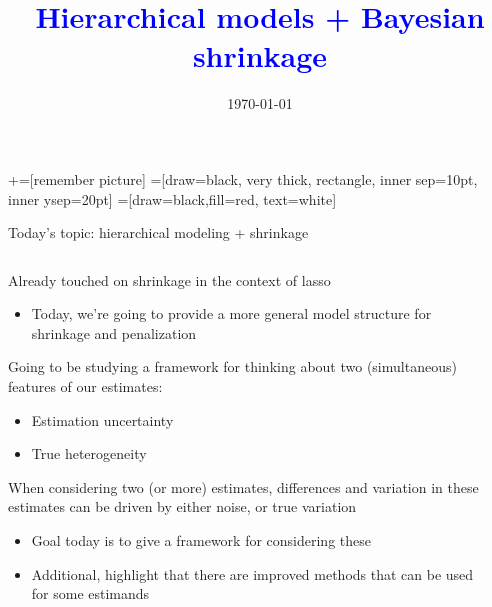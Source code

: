 \documentclass[notes,11pt, aspectratio=169]{beamer}
\title[]{\textcolor{blue}{Hierarchical models + Bayesian shrinkage}}
\author[PGP]{}
\institute[FRBNY]{\small{Paul Goldsmith-Pinkham}}
\date{\today}
\newenvironment{wideitemize}{\itemize\addtolength{\itemsep}{10pt}}{\enditemize}
\begin{document}
\newcommand\marktopleft[1]{%
    \tikz[overlay,remember picture] 
        \node (marker-#1-a) at (-.3em,.3em) {};%
}
\newcommand\markbottomright[2]{%
    \tikz[overlay,remember picture] 
        \node (marker-#1-b) at (0em,0em) {};%
}
+=[remember picture] 
 =[draw=black, very thick, rectangle, inner sep=10pt, inner ysep=20pt]
 =[draw=black,fill=red, text=white]

\begin{frame}
\maketitle

\end{frame}


\begin{frame}{Today's topic: hierarchical modeling + shrinkage}
  \begin{columns}[T] %
    \begin{column}{.7\textwidth}
      \begin{wideitemize}
      \item Already touched on shrinkage in the context of lasso
        \begin{itemize}
        \item Today, we're going to provide a more general model
          structure for shrinkage and penalization
        \end{itemize}
      \item Going to be studying a framework for thinking about two (simultaneous) features of our estimates:
        \begin{itemize}
        \item Estimation uncertainty
        \item True heterogeneity
        \end{itemize}
      \item When considering two (or more) estimates, differences and
        variation in these estimates can be driven by either noise, or
        true variation
        \begin{itemize}
        \item Goal today is to give a framework for considering these
        \item Additional, highlight that there are improved methods
          that can be used for some estimands
        \end{itemize}
      \end{wideitemize}
    \end{column}%
  \hfill%
  \begin{column}{.4\textwidth}
  \end{column}
\end{columns}
\end{frame}
\end{document}
